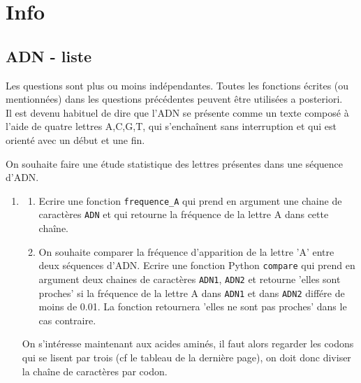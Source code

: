 




\section{Info}

\subsection{ADN - liste}
\begin{exercice}[Informatique]
Les questions sont plus ou moins indépendantes. Toutes les fonctions écrites (ou mentionnées) dans les questions précédentes peuvent être utilisées a posteriori. \\


Il est devenu habituel de dire que l'ADN se présente comme un texte composé à l'aide de quatre lettres A,C,G,T, qui s'enchaînent sans interruption et qui est orienté avec un début et une fin. 


On souhaite faire une étude statistique des lettres présentes dans une séquence d'ADN. 
\begin{enumerate}
\item \begin{enumerate}


\item Ecrire une fonction \texttt{frequence\_A} qui prend en argument une chaine de caractères \texttt{ADN}  et qui retourne la fréquence de la lettre A dans cette chaîne. 

\item On souhaite comparer la fréquence d'apparition de la lettre 'A' entre deux séquences d'ADN. Ecrire une fonction Python \texttt{compare} qui prend en argument deux chaines de caractères \texttt{ADN1}, \texttt{ADN2} et retourne 'elles sont proches' si la fréquence de la lettre A dans \texttt{ADN1} et dans \texttt{ADN2} différe de moins de 0.01. La fonction retournera 'elles ne sont pas proches' dans le cas contraire. \\
\end{enumerate}

On s'intéresse maintenant aux acides aminés, il faut alors regarder les codons qui se lisent par trois (cf le tableau de la dernière page), on doit donc diviser la chaîne de caractères par codon. 


\end{enumerate}
\end{exercice}
